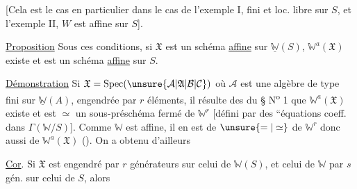 [Cela est le cas en particulier dans le cas de l'exemple I,   fini et loc. libre sur $S$, et l'exemple II,  $W$  est affine sur $S$].

\uline{Proposition} Sous ces conditions, si  $\mathfrak X$ est un schéma \uline{affine} sur $\underline{\mathbb W}(S)$, $\mathbb W^a(\mathfrak X)$ existe et est un schéma \uline{affine} sur $S$.

\uline{Démonstration}   Si $\mathfrak X=\operatorname{Spec}(\unsure{\mathcal A|\mathfrak A|\mathcal B|\mathcal C})$ où $\mathcal A$ est une algèbre de type fini  sur $\underline{\mathbb W}(A)$, engendrée par $r$ éléments, il résulte des  du \S{} N\textsuperscript{o} 1 que $\mathbb W^a(\mathfrak X)$ existe et est $\simeq$ un sous-préschéma fermé de $\mathbb W^r$ [défini par des ``équations   coeff. dans $\Gamma(\mathbb W/S)$]. Comme $\mathbb W$ est affine, il en est de $\unsure{=|\simeq}$ de  $\mathbb W^r$ donc aussi de $\mathbb W^a(\mathfrak X)$ (). On a obtenu d'ailleurs

\uline{Cor}.    Si $\mathfrak X$ est engendré par $r$ générateurs sur celui de $\mathbb W(S)$, et celui de $\mathbb W$ par $s$ gén. sur celui de $S$, alors

